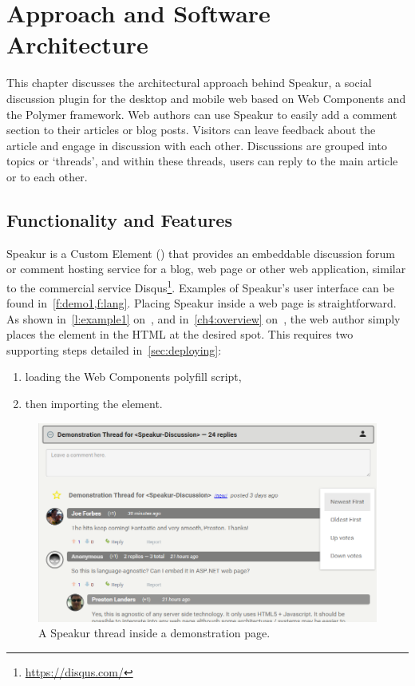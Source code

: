 \chapter{Approach and Software Architecture}
%
\label{ch:approach}

This chapter discusses the architectural approach behind Speakur, 
a social discussion plugin for the desktop and mobile web based on Web Components and the Polymer framework.
Web authors can use Speakur to easily add a comment section to their articles or blog posts.
Visitors can leave feedback about the article and engage in discussion with each other.
Discussions are grouped into topics or `threads', and within these threads, users can reply to the main article or to each other.

\section{Functionality and Features}
Speakur 
is a Custom Element 
() 
that provides an embeddable discussion forum or comment hosting service for a blog, web page or other web application, similar to the commercial service Disqus\footnote{\url{https://disqus.com/}}.
Examples of Speakur's user interface can be found in~\cref{f:demo1,f:lang}.
Placing Speakur inside a web page is straightforward.
As shown in~\cref{l:example1} on~,
and in~\cref{ch4:overview} on~,
the web author simply places the 
 element in the HTML at the desired spot.
This requires two supporting steps detailed in~\cref{sec:deploying}:
\begin{enumerate}
\item loading the Web Components polyfill script,
\item then importing the  element.
\end{enumerate}

\begin{figure}[htb]
\centering
 \includegraphics[width=\textwidth]{images/screenshot_20150312_1630_v2.png}
\caption{A Speakur thread inside a demonstration page.}
\label{f:demo1}
\end{figure}

